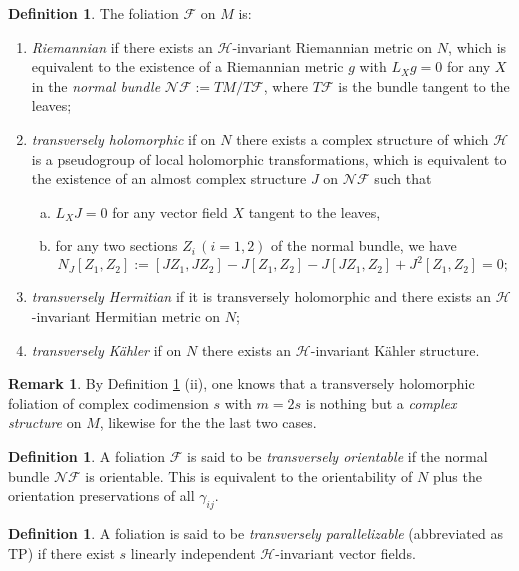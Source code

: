 \documentclass[12pt]{amsart}
\numberwithin{equation}{section}
\theoremstyle{definition}
\theoremstyle{definition}
\newtheorem{definition}  [theorem]     {Definition}
\theoremstyle{definition}
\newtheorem{remark}  [theorem]     {Remark}
\renewcommand{\1}{\mathsf{1}}
\renewcommand{\>}{\rightarrow}
\def\mc{\mathcal}
\theoremstyle{plain} %
\theoremstyle{plain} %
\theoremstyle{plain} %
\begin{document}
	\begin{definition} \label{definitian transversely holom}The foliation $\mathcal{F}$ on $M$ is:
		\begin{enumerate}[$(i)$]
			\item \textit{Riemannian} if there exists an $\mathcal H$-invariant Riemannian metric on $N$, which is equivalent to the existence of a Riemannian metric $g$ with $L_Xg=0$ for any $X$ in the \textit{normal bundle} $\mathcal N\mathcal{F}:=TM/T\mathcal F$, where $T\mathcal{F}$ is the bundle tangent to the leaves;
			\item  \textit{transversely holomorphic} if on $N$ there exists a complex structure of which $\mc H$ is a pseudogroup of local holomorphic transformations, which is equivalent to the existence of an almost complex structure $J$ on $\mathcal N\mathcal{F}$ such that
			\begin{enumerate}[(a)]
				\item $L_X J=0$ for any vector field $X$ tangent to the leaves,
				
				\item 	for any two  sections $Z_i\,(i=1,2)$ of the normal bundle, we have $$N_J[Z_1,Z_2]:=[JZ_1,JZ_2]-J[Z_1,Z_2]-J[JZ_1,Z_2]+J^2[Z_1,Z_2]=0;$$
				
			\end{enumerate}
			\item  \textit{transversely Hermitian} if it is transversely holomorphic and there exists an $\mathcal H$-invariant Hermitian metric on $N$;
			\item \textit{transversely K\"ahler} if on $N$ there exists an $\mathcal H$-invariant K\"ahler structure.
		\end{enumerate}
	\end{definition}
	
	\begin{remark}\label{relationship foliation cpst}
		By Definition \ref{definitian transversely holom} (ii), one knows that a transversely holomorphic foliation of complex codimension $s$ with $m=2s$ is nothing but a \textit{complex structure} on $M$, likewise
		for the the last two cases.
	\end{remark}
	\begin{definition}
		A foliation $\mathcal{F}$ is said to be \textit{transversely orientable} if the normal bundle $\mc N \mc F$ is orientable. This is equivalent to the orientability of $N$ plus the orientation preservations of all  $\gamma_{i j}$.
	\end{definition}
	\begin{definition}
		A foliation is said to be \textit{transversely parallelizable} (abbreviated as TP) if there exist $s$ linearly independent $\mc H$-invariant vector fields.
	\end{definition}
	
\end{document}
